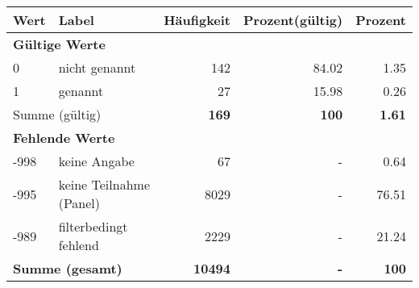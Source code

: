      \begin{longtable}{lXrrr}
     \toprule
     \textbf{Wert} & \textbf{Label} & \textbf{Häufigkeit} & \textbf{Prozent(gültig)} & \textbf{Prozent} \\
     \endhead
     \midrule
     \multicolumn{5}{l}{\textbf{Gültige Werte}}\\

     0 &
     \multicolumn{1}{X}{ nicht genannt   } &


       \num{142} &
       \num[round-mode=places,round-precision=2]{84,02} &
         \num[round-mode=places,round-precision=2]{1,35} \\

     1 &
     \multicolumn{1}{X}{ genannt   } &


       \num{27} &
       \num[round-mode=places,round-precision=2]{15,98} &
         \num[round-mode=places,round-precision=2]{0,26} \\
     \midrule
     \multicolumn{2}{l}{Summe (gültig)} &
       \textbf{\num{169}} &
     \textbf{100} &
       \textbf{\num[round-mode=places,round-precision=2]{1,61}} \\
     \multicolumn{5}{l}{\textbf{Fehlende Werte}}\\
       -998 &
       keine Angabe &
         \num{67} &
        - &
         \num[round-mode=places,round-precision=2]{0,64} \\
       -995 &
       keine Teilnahme (Panel) &
         \num{8029} &
        - &
         \num[round-mode=places,round-precision=2]{76,51} \\
       -989 &
       filterbedingt fehlend &
         \num{2229} &
        - &
         \num[round-mode=places,round-precision=2]{21,24} \\
     \midrule
     \multicolumn{2}{l}{\textbf{Summe (gesamt)}} &
          \textbf{\num{10494}} &
        \textbf{-} &
        \textbf{100} \\
     \bottomrule
     \end{longtable}
     
